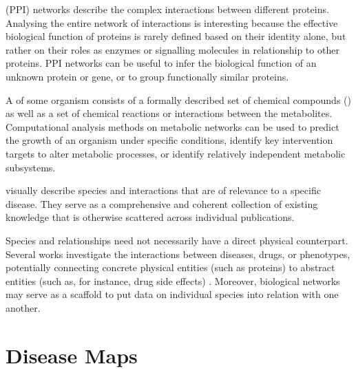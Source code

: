\documentclass[
	fontsize=10pt, %
	twoside=false, %
	secnumdepth=1, %
  toc=indentunnumbered %
]{kaobook}
\begin{document}
 (PPI) networks describe the complex
interactions between different proteins. Analysing the entire network of
interactions is interesting because the effective biological function of
proteins is rarely defined based on their identity alone, but rather on their
roles as enzymes or signalling molecules in relationship to other proteins.
\textsc{PPI} networks can be useful to infer the biological function of an
unknown protein or gene, or to group functionally similar proteins.

A  of some organism consists of a formally described set of
chemical compounds () as well as a set of chemical reactions or
interactions between the metabolites. Computational analysis methods on
metabolic networks can be used to predict the growth of an organism under
specific conditions, identify key intervention targets to alter metabolic
processes, or identify relatively independent metabolic subsystems.

 visually describe species and interactions that are of relevance
to a specific disease. They serve as a comprehensive and coherent collection of
existing knowledge that is otherwise scattered across individual publications.

Species and relationships need not necessarily have a direct physical
counterpart. Several works investigate the interactions between diseases, drugs,
or phenotypes, potentially connecting concrete physical entities (such as
proteins) to abstract entities (such as, for instance, drug side effects)
\cite{ruiz_identification_2021, barabasi_NetworkMedicineNetworkbased_2011}.
Moreover, biological networks
may serve
as a scaffold to put data on individual species into relation with one another.

\section{Disease Maps}

\end{document}
